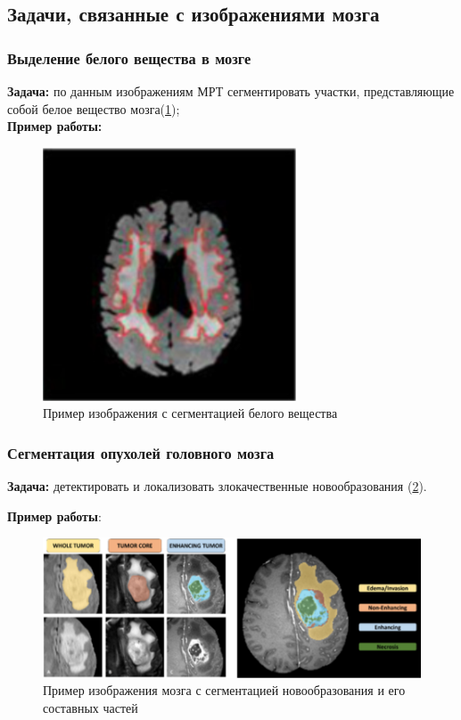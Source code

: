 \subsection{Задачи, связанные с изображениями мозга}

\subsubsection{Выделение белого вещества в мозге}
{\bf Задача:} по данным изображениям МРТ сегментировать участки, представляющие собой белое вещество мозга(\ref{fig:whitematter});
\\
{\bf Пример работы:} \cite{white_matter}


\begin{figure}[ht] 
  \center
  \includegraphics [scale=1.0] {images/white_matter.png}
  \caption{ Пример изображения с сегментацией белого вещества\cite{white_matter} } 
  \label{fig:whitematter}  
\end{figure}


\subsubsection{Сегментация опухолей головного мозга}

{\bf Задача:} детектировать и локализовать злокачественные новообразования (\ref{fig:brats}).

{\bf Пример работы}: \cite{BRATS_winning_2018}
\begin{figure}[ht] 
  \center
  \includegraphics [scale=0.8] {images/brats.png}
  \caption{ Пример изображения мозга с сегментацией новообразования и его составных частей \cite{BRATS_2018} } 
  \label{fig:brats}  
\end{figure}


